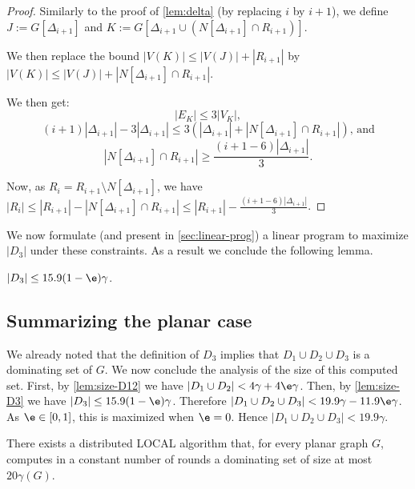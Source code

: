 \begin{proof}
  Similarly to the proof of \cref{lem:delta} (by replacing $i$ by
  $i+1$), we define $J := G[\Delta_{i+1}]$ and
  $K:= G[\Delta_{i+1} \cup (N[\Delta_{i+1}]\cap R_{i+1})]$.

  We then
  replace the bound $|V(K)| \le |V(J)| + |R_{i+1}|$ by
  $|V(K)| \le |V(J)| + |N[\Delta_{i+1}]\cap R_{i+1}|$.

  We then get:
  \[|E_K| \leq 3 |V_K|, \]
  \[(i+1)|\Delta_{i+1}| - 3|\Delta_{i+1}| \leq 3(|\Delta_{i+1}| +
    |N[\Delta_{i+1}]\cap R_{i+1}|)\text{, and}\]
  \[ |N[\Delta_{i+1}]\cap R_{i+1}| \geq \frac{(i+1-6)|\Delta_{i+1}|}{3}.\]

  Now, as $R_i = R_{i+1} \setminus N[\Delta_{i+1}]$, we have
  $|R_i| \le |R_{i+1}| - |N[\Delta_{i+1}]\cap R_{i+1}|\leq |R_{i+1}| -
  \frac{(i+1-6)|\Delta_{i+1}|}{3}$.
\end{proof}

We now formulate (and present in \cref{sec:linear-prog}) a linear program to
maximize $|D_3|$ under these constraints. As a result we conclude the
following lemma.

\begin{lemma}\label{lem:size-D3}
  $|D_3|\le 15.9(1-\e)\gamma$.
\end{lemma}








\subsection{Summarizing the planar case}

We already noted that the definition of $D_3$ implies that
$D_1\cup D_2\cup D_3$ is a dominating set of $G$. We now conclude the
analysis of the size of this computed set.  First, by
\cref{lem:size-D12} we have $|D_1\cup D_2|<4\gamma+4\e\gamma$.  Then,
by \cref{lem:size-D3} we have $|D_3|\le 15.9(1-\e)\gamma$.
%
Therefore $|D_1 \cup D_2 \cup D_3| < 19.9\gamma -11.9\e\gamma$.
%
As $\e\in[0,1]$, this is maximized when $\e=0$. Hence
\mbox{$|D_1 \cup D_2 \cup D_3|< 19.9 \gamma$}.

\begin{theorem}\label{thm:planar-greedy}
  There exists a distributed LOCAL algorithm that, for every planar
  graph $G$, computes in a constant number of rounds a dominating set
  of size at most $20\gamma(G)$.
\end{theorem}
